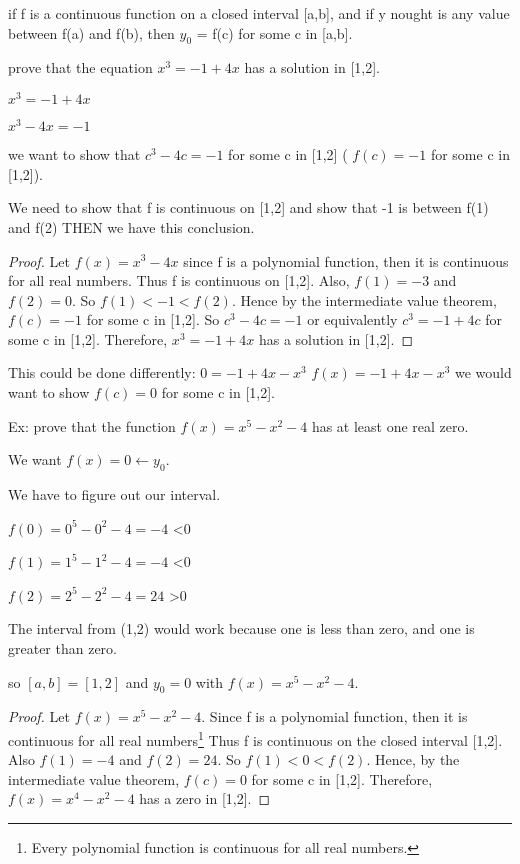 \documentclass[12pt]{article}
\begin{document}
if f is a continuous function on a closed interval [a,b], and if y nought is any value between f(a) and f(b),
then $y_0$ = f(c) for some c in [a,b].

prove that the equation $x^3 = -1 + 4x$ has a solution in [1,2].

$x^3 = -1 + 4x$

$x^3 - 4x = -1$

we want to show that $c^3 - 4c = -1$ for some c in [1,2] ( $f(c) = -1$ for some c in [1,2]).

We need to show that f is continuous on [1,2] and show that -1 is between f(1) and f(2) THEN we have this conclusion.

\begin{proof}
Let $f(x) = x^3 - 4x$ since f is a polynomial function, then it is continuous for all real numbers. Thus f is
continuous on [1,2]. Also, $f(1) = -3$ and $f(2) = 0$. So $f(1) < -1 < f(2)$. Hence by the intermediate value
theorem, $f(c) = -1$ for some c in [1,2]. So $c^3-4c=-1$ or equivalently $c^3=-1+4c$ for some c in
[1,2]. Therefore, $x^3 = -1 + 4x$ has a solution in [1,2].
\end{proof}
This could be done differently:
$0 = -1 + 4x - x^3$
$f(x) = -1 + 4x - x^3$
we would want to show $f(c) = 0$ for some c in [1,2].


Ex: prove that the function $f(x) = x^5 - x^2 - 4$ has at least one real zero.

We want $f(x) = 0 \leftarrow y_0$. 

We have to figure out our interval.

$f(0) = 0^5 - 0^2 - 4 = -4$ <0

$f(1) = 1^5 - 1^2 - 4 = -4$ <0

$f(2) = 2^5 - 2^2 - 4 = 24$ >0

The interval from (1,2) would work because one is less than zero, and one is greater than zero.

so $[a,b] = [1,2]$ and $y_0 = 0$ with $f(x) = x^5 - x^2 - 4$.


\begin{proof}
Let $f(x) = x^5 - x^2 - 4$. Since f is a polynomial function, then it is continuous for all real
numbers\footnote{Every polynomial function is continuous for all real numbers.} Thus f is continuous on the
closed interval [1,2]. Also $f(1) = -4$ and $f(2) = 24$. So $f(1) < 0 < f(2)$. Hence, by the intermediate
value theorem, $f(c) = 0$ for some c in [1,2]. Therefore, $f(x) = x^4 - x^2-4$ has a zero in [1,2].
\end{proof}
\end{document}
